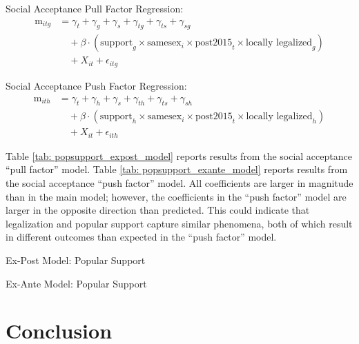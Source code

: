 \documentclass[12pt,letterpaper]{article}
\begin{document}
\hfill
\break
Social Acceptance Pull Factor Regression:
\begin{equation}
\begin{aligned}
\text{m}_{itg} &= \gamma_t + \gamma_g + \gamma_s + \gamma_{tg} + \gamma_{ts} + \gamma_{sg} \\
&\quad + \beta \cdot (\text{support}_g \times \text{samesex}_i \times \text{post2015}_t \times \text{locally legalized}_g) \\
&\quad + X_{it} + \epsilon_{itg}
\end{aligned}
\end{equation}

\hfill
\break
Social Acceptance Push Factor Regression:
\begin{equation}
\begin{aligned}
\text{m}_{ith} &= \gamma_t + \gamma_h + \gamma_s + \gamma_{th} + \gamma_{ts} + \gamma_{sh} \\
&\quad + \beta \cdot (\text{support}_h \times \text{samesex}_i \times \text{post2015}_t \times \text{locally legalized}_h) \\
&\quad + X_{it} + \epsilon_{ith}
\end{aligned}
\end{equation}

Table \ref{tab: popsupport_expost_model} reports results from the social acceptance “pull factor” model. Table \ref{tab: popsupport_exante_model} reports results from the social acceptance “push factor” model. All coefficients are larger in magnitude than in the main model; however, the coefficients in the “push factor” model are larger in the opposite direction than predicted. This could indicate that legalization and popular support capture similar phenomena, both of which result in different outcomes than expected in the “push factor” model.

\begin{table}[h] %
    \centering
    \caption{Ex-Post Model: Popular Support}
    \label{tab: popsupport_expost_model}
    
\end{table}
\begin{table}[h]
    \centering
    \caption{Ex-Ante Model: Popular Support}
    \label{tab: popsupport_exante_model}
    
\end{table}

\section{Conclusion}
\end{document}

